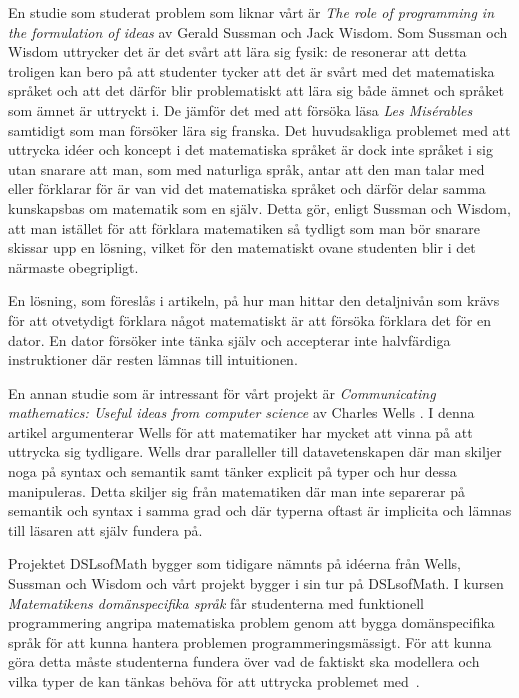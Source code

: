 \documentclass[12pt,a4paper,twoside,openright]{article}
\begin{document}
En studie som studerat problem som liknar vårt är \textit{The role of
programming in the formulation of ideas} \cite{sussman2002role} av 
Gerald Sussman och Jack Wisdom.
Som Sussman och Wisdom uttrycker det är det svårt att lära sig fysik:
de resonerar att detta troligen kan bero på
att studenter tycker att det är svårt med det matematiska språket och
att det därför blir problematiskt att lära sig både ämnet och språket
som ämnet är uttryckt i. De jämför det med att försöka läsa
\textit{Les Misérables} samtidigt som man försöker lära sig
franska. Det huvudsakliga problemet med att uttrycka idéer och koncept
i det matematiska språket är dock inte språket i sig utan snarare att
man, som med naturliga språk, antar att den man talar med eller
förklarar för är van vid det matematiska språket och därför delar
samma kunskapsbas om matematik som en själv. Detta gör, enligt Sussman
och Wisdom, att man istället för att förklara
matematiken så tydligt som man bör snarare skissar upp en lösning,
vilket för den matematiskt ovane studenten blir i det närmaste
obegripligt.

En lösning, som föreslås i artikeln, på hur man hittar den
detaljnivån som krävs för att otvetydigt förklara något matematiskt är
att försöka förklara det för en dator. En dator försöker inte tänka
själv och accepterar inte halvfärdiga instruktioner där resten lämnas
till intuitionen.

En annan studie som är intressant för vårt projekt är
\textit{Communicating mathematics: Useful ideas from computer science}
av Charles Wells \cite{wells1995communicating}. I denna artikel 
argumenterar Wells för att matematiker har mycket att vinna på att 
uttrycka sig tydligare. Wells
drar paralleller till datavetenskapen där man skiljer noga på syntax
och semantik samt tänker explicit på typer och hur dessa
manipuleras. Detta skiljer sig från matematiken där man inte separerar
på semantik och syntax i samma grad och där typerna oftast är
implicita och lämnas till läsaren att själv fundera på.

Projektet DSLsofMath bygger som tidigare nämnts på idéerna från Wells,
Sussman och Wisdom och vårt projekt bygger i sin tur på DSLsofMath. 
I kursen \textit{Matematikens domänspecifika
 språk} får studenterna med funktionell programmering angripa
matematiska problem genom att bygga domänspecifika språk för att kunna
hantera problemen programmeringsmässigt. För att kunna göra detta
måste studenterna fundera över vad de faktiskt ska modellera och vilka
typer de kan tänkas behöva för att uttrycka problemet
med~\cite{kursplan:dslsofmath}.
\end{document}
